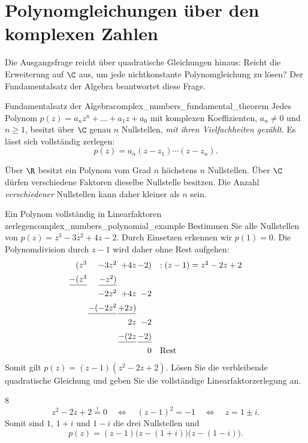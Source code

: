 \section{Polynomgleichungen über den komplexen Zahlen}
\label{sec:complex_numbers_polynomial_equations}
Die Ausgangsfrage reicht über quadratische Gleichungen hinaus: Reicht die
Erweiterung auf $\C$ aus, um jede nichtkonstante Polynomgleichung zu lösen?
Der Fundamentalsatz der Algebra beantwortet diese Frage.

\begin{TheoremBox}{Fundamentalsatz der Algebra}{complex_numbers_fundamental_theorem}
  Jedes Polynom $p(z)=a_nz^n+\dots+a_1z+a_0$ mit komplexen Koeffizienten,
  $a_n\ne0$ und $n\ge1$, besitzt über $\C$ genau $n$ Nullstellen,
  \emph{mit ihren Vielfachheiten gezählt}. Es lässt sich vollständig zerlegen:
  \[
    p(z)=a_n(z-z_1)\cdots(z-z_n).
  \]
\end{TheoremBox}
Über $\R$ besitzt ein Polynom vom Grad $n$ höchstens $n$ Nullstellen.
Über $\C$ dürfen verschiedene Faktoren dieselbe Nullstelle besitzen. Die Anzahl
\emph{verschiedener} Nullstellen kann daher kleiner als $n$ sein.

\begin{ExampleBox}{Ein Polynom vollständig in Linearfaktoren zerlegen}{complex_numbers_polynomial_example}
  Bestimmen Sie alle Nullstellen von $p(z)=z^3-3z^2+4z-2$.
  Durch Einsetzen erkennen wir $p(1)=0$. Die Polynomdivision durch $z-1$
  wird daher ohne Rest aufgehen:
  \[
    \begin{array}{@{}r@{\,}r@{\,}r@{\,}r@{\quad}l@{}}
      (z^3&-3z^2&+4z&-2)&:(z-1)=z^2-2z+2\\[5pt]
      \underline{-(z^3}&\underline{-z^2)}&&&\\[5pt]
      &-2z^2&+4z&-2&\\[5pt]
      &\underline{-(-2z^2}&\underline{+2z)}&&\\[5pt]
      &&2z&-2&\\[5pt]
      &&\underline{-(2z}&\underline{-2)}&\\[5pt]
      &&&0&\text{Rest}
    \end{array}
  \]
  Somit gilt $p(z)=(z-1)(z^2-2z+2)$.
  Lösen Sie die verbleibende quadratische Gleichung und geben Sie die
  vollständige Linearfaktorzerlegung an.
  \begin{ClozeArea}{8}
    \[
      z^2-2z+2\overset{!}{=}0
      \quad\Longleftrightarrow\quad (z-1)^2=-1
      \quad\Longleftrightarrow\quad z=1\pm i.
    \]
    Somit sind $1$, $1+i$ und $1-i$ die drei Nullstellen und
    \[
      p(z)=(z-1)\bigl(z-(1+i)\bigr)\bigl(z-(1-i)\bigr).
    \]
  \end{ClozeArea}
\end{ExampleBox}

